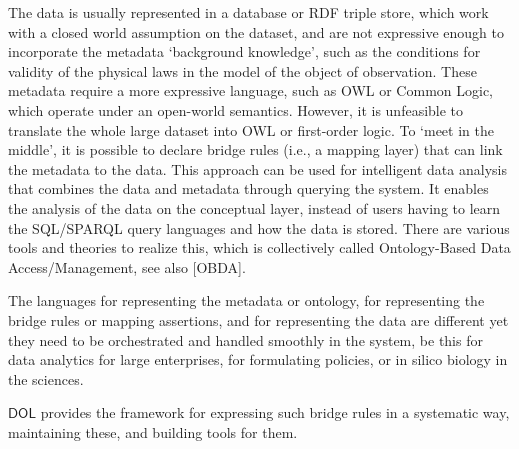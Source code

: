 \documentclass[10pt,fleqn,final]{scrreprt}
\newcommand*{\termref}[1]{\index{#1}#1\xspace}
\newcommand*{\DOL}{\ensuremath{\mathsf{DOL}}\xspace}
\newenvironment{definitions}[0]{\medskip }{}
\begin{document}
\begin{definitions}
The data is usually represented in a database or RDF triple store, which work with a \termref{closed world assumption} on the dataset, and are not expressive enough to 
incorporate the metadata `background knowledge', such as the conditions for validity of the physical laws in the model of the object of observation. These metadata 
require a more expressive language, such as OWL or Common Logic, which operate under an open-world semantics. However, it is unfeasible to translate the 
whole large dataset into OWL or first-order logic. To `meet in the middle', it is possible to declare bridge rules (i.e., a mapping layer) that can link the metadata to 
the data. This approach can be used for intelligent data analysis that combines the data and metadata through querying the system. It enables the analysis of the 
data on the conceptual layer, instead of users having to learn the SQL/SPARQL query languages and how the data is stored. There are various tools and theories 
to realize this, which is collectively called Ontology-Based Data Access/Management, see also [OBDA].

The languages for representing the metadata or ontology, for representing the bridge rules or mapping assertions, and for representing the data are different yet 
they need to be orchestrated and handled smoothly in the system, be this for data analytics for large enterprises, for formulating policies, or in silico biology in the 
sciences. 

\DOL  provides the framework for expressing such bridge rules in a systematic way, maintaining these, and building tools for them. 



\end{definitions}
\end{document}
